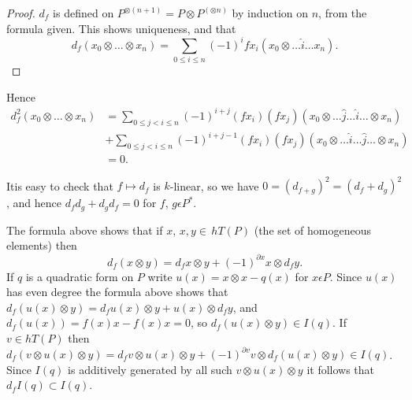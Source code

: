 \begin{proof}%
$d_f$ is defined on $P^{\otimes (n+1)} = P \otimes P^{(\otimes n)}$ by
  induction on $n$, from the formula given. This shows uniqueness, and
  that  
$$
d_f (x_0 \otimes \ldots \otimes x_n) = \sum_{0 \leq i \leq n} (-1)^i
fx_i (x_0 \otimes \ldots \hat{i} \ldots x_n). 
$$
\end{proof}

Hence 
\begin{align*}
d^2_f (x_0 \otimes \ldots \otimes x_n) & = \sum_{0 \leq j < i \leq n}
(-1)^{i +j} (fx_i) (fx_j) (x_0 \otimes \ldots \hat{j} \ldots \hat{i}
\ldots \otimes x_n) \\ 
& + \sum_{0 \leq j < i \leq n} (-1)^{i +j-1} (fx_i) (fx_j) (x_0 \otimes
\ldots \hat{i} \ldots \hat{j} \ldots \otimes x_n) \\ 
& = 0.
\end{align*}

It\pageoriginale is easy to check that $f \mapsto d_f$ is $k$-linear,
so we have $0 = (d_{f +g})^2 = (d_f + d_g)^2$, and hence $d_f d_g +
d_g d_f =0$ for $f$, $g \epsilon P^*$.  

The formula above shows that if $x$, $x, y \in \, hT (P)$ (the set of 
homogeneous elements) then  
$$
d_f (x \otimes y) = d_f x \otimes y + (-1)^{\partial x} x \otimes d_f
y. 
$$
If $q$ is a quadratic form on $P$ write $u(x) = x \otimes x - q(x)$
for $x \epsilon P$. Since $u(x)$ has even degree the formula above
shows that $d_f (u(x) \otimes y) = d_f u (x) \otimes y + u (x) \otimes
d_f y$, and $d_f(u(x)) = f(x) x - f(x) x =0$, so $d_f (u(x) \otimes y)
\in I(q)$. If $v \in hT (P)$ then $d_f (v \otimes u(x) \otimes y) =
d_f v \otimes u (x) \otimes y + (-1)^{\partial v} v \otimes d_f (u(x)
\otimes y) \in I (q)$. Since $I(q)$ is additively generated by all
such $v \otimes u(x) \otimes y$ it follows that $d_f I (q) \subset I
(q)$. 


